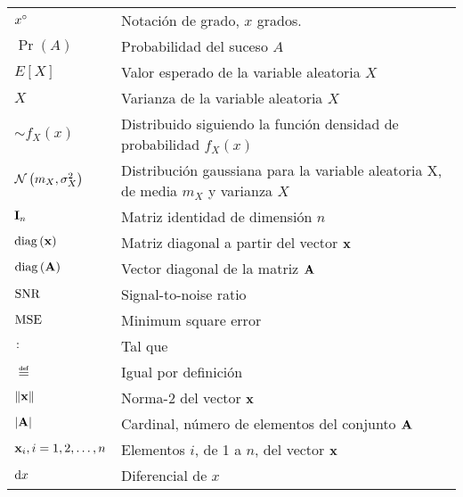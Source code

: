 \begin{longtable}{p{3cm}p{8.5cm}}
$x^\circ$ & Notación de grado, $x$ grados.\\
%
%
$\Pr\left( {A} \right)$ & Probabilidad del suceso $A$ \\
$\displaystyle E\left[ {X} \right]$ & Valor esperado de la variable aleatoria $X$ \\
$\si{X}$ & Varianza de la variable aleatoria $X$\\
$\sim f_{X}\left( {x} \right)$ & Distribuido siguiendo la función densidad de probabilidad $f_{X}\left( {x} \right)$\\
%
$\mathcal{N}\left( {m_{X}, \sigma_{X}^{2}} \right)$ &Distribución gaussiana para la variable aleatoria X, de media $m_{X}$ y varianza $\si{X}$ \\
$\mathbf{I}_{n}$ & Matriz identidad de dimensión $n$\\
$\mathrm{diag}\left(\mathbf{x}\right)$ & Matriz diagonal a partir del vector $\mathbf{x}$\\
$\mathrm{diag}\left(\mathbf{A}\right)$ & Vector diagonal de la matriz $\mathbf{A}$\\
$\mathrm{SNR}$& Signal-to-noise ratio \\
$\mathrm{MSE}$ & Minimum square error\\
$\colon$ & Tal que \\
$\eqdef$ & Igual por definición \\
$\left\lVert \mathbf{x} \right\rVert $ & Norma-2 del vector $\mathbf{x}$\\
$\left| \mathbf{{A}}\right|$ & Cardinal, número de elementos del conjunto $\mathbf{A}$\\
$\mathbf{x}_{i},i=1,2,\ldots,n$ & Elementos $i$, de 1 a $n$, del vector $\mathbf{x}$\\
$\mathrm{d}{x}$& Diferencial de $x$\\

\end{longtable}
